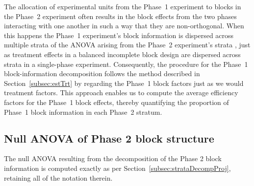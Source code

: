\documentclass[article]{jss}
\begin{document}
The allocation of experimental units from the Phase~1 experiment to blocks in the Phase~2 experiment often results in the block effects from the two phases interacting with one another in such a way that they are non-orthogonal. When this happens the Phase~1 experiment's block information is dispersed across multiple strata of the ANOVA arising from the Phase~2 experiment's strata \citep{Wood1988}, just as treatment effects in a balanced incomplete block design are dispersed across strata in a single-phase experiment. Consequently, the procedure for the Phase~1 block-information decomposition follows the method described in Section~\ref{subsec:estTrt} by regarding the Phase~1 block factors just as we would treatment factors. This approach enables us to compute the average efficiency factors for the Phase~1 block effects, thereby quantifying the proportion of Phase~1 block information in each Phase~2 stratum.

\subsection{Null ANOVA of Phase 2 block structure}
The null ANOVA resulting from the decomposition of the Phase 2 block information is computed exactly as per Section~\ref{subsec:strataDecompProj}, retaining all of the notation therein.
\end{document}
